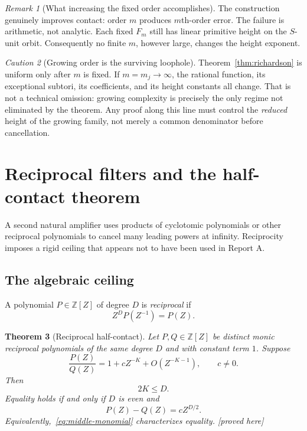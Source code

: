 \documentclass[11pt,oneside]{article}
\newtheorem{theorem}{Theorem}[section]
\theoremstyle{definition}
\theoremstyle{remark}
\newtheorem{remark}[theorem]{Remark}
\newtheorem{warning}[theorem]{Caution}
\newcommand{\Z}{\mathbb Z}
\newcommand{\proved}{\textcolor{deepgreen}{\textsf{[proved here]}}}
\begin{document}
\begin{remark}[What increasing the fixed order accomplishes]
The construction genuinely improves contact: order $m$ produces $m$th-order error.  The
failure is arithmetic, not analytic.  Each fixed $F_m$ still has linear primitive height on
the $S$-unit orbit.  Consequently no finite $m$, however large, changes the height exponent.
\end{remark}

\begin{warning}[Growing order is the surviving loophole]
Theorem~\ref{thm:richardson} is uniform only after $m$ is fixed.  If $m=m_j\to\infty$, the
rational function, its exceptional subtori, its coefficients, and its height constants all
change.  That is not a technical omission: growing complexity is precisely the only regime
not eliminated by the theorem.  Any proof along this line must control the \emph{reduced}
height of the growing family, not merely a common denominator before cancellation.
\end{warning}

\section{Reciprocal filters and the half-contact theorem}
\label{sec:reciprocal}

A second natural amplifier uses products of cyclotomic polynomials or other reciprocal
polynomials to cancel many leading powers at infinity.  Reciprocity imposes a rigid ceiling
that appears not to have been used in Report A.

\subsection{The algebraic ceiling}

A polynomial $P\in\Z[Z]$ of degree $D$ is \emph{reciprocal} if
\begin{equation}
 Z^DP(Z^{-1})=P(Z).
 \label{eq:reciprocal}
\end{equation}

\begin{theorem}[Reciprocal half-contact]
\label{thm:half-contact}
Let $P,Q\in\Z[Z]$ be distinct monic reciprocal polynomials of the same degree $D$ and with
constant term $1$.  Suppose
\begin{equation}
 \frac{P(Z)}{Q(Z)}=1+cZ^{-K}+O(Z^{-K-1}),
 \qquad c\ne0.
 \label{eq:contact-infinity}
\end{equation}
Then
\begin{equation}
 2K\le D.
 \label{eq:half-bound}
\end{equation}
Equality holds if and only if $D$ is even and
\begin{equation}
 P(Z)-Q(Z)=cZ^{D/2}.
 \label{eq:middle-monomial}
\end{equation}
Equivalently,~\eqref{eq:middle-monomial} characterizes equality.
\proved
\end{theorem}
\end{document}
